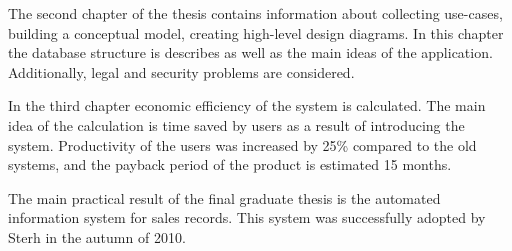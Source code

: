 \documentclass[a4paper, 12pt]{article}
\begin{document}
The second chapter of the thesis contains information about collecting use-cases, building a conceptual model, creating high-level design diagrams. In this chapter the database structure is describes as well as the main ideas of the application. Additionally, legal and security problems are considered.

In the third chapter economic efficiency of the system is calculated. The main idea of the calculation is time saved by users as a result of introducing the system. Productivity of the users was increased by 25\% compared to the old systems, and the payback period of the product is estimated 15 months.

The main practical result of the final graduate thesis is the automated information system for sales records. This system was successfully adopted by Sterh in the autumn of 2010.
\end{document}
